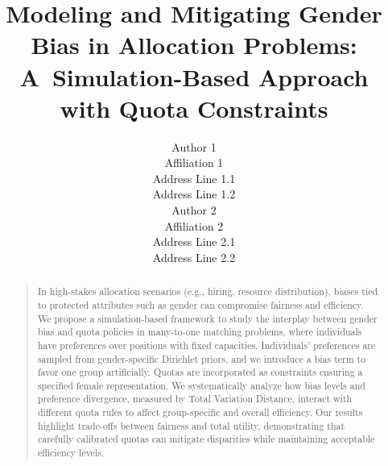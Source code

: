 \documentclass[letterpaper]{article}
\begin{document}
\title{Modeling and Mitigating Gender Bias in Allocation Problems: A~Simulation-Based Approach with Quota Constraints}
\author{Author 1\\
Affiliation 1\\
Address Line 1.1\\
Address Line 1.2\\
\And Author 2\\
Affiliation 2\\
Address Line 2.1\\
Address Line 2.2\\
}


\maketitle
\begin{abstract}
\begin{quote}
In high-stakes allocation scenarios (e.g., hiring, resource distribution), biases tied to protected attributes such as gender can compromise fairness and efficiency. We propose a simulation-based framework to study the interplay between gender bias and quota policies in many-to-one matching problems, where individuals have preferences over positions with fixed capacities. Individuals' preferences are sampled from gender-specific Dirichlet priors, and we introduce a bias term to favor one group artificially. Quotas are incorporated as constraints ensuring a specified female representation. We systematically analyze how bias levels and preference divergence, measured by Total Variation Distance, interact with different quota rules to affect group-specific and overall efficiency. Our results highlight trade-offs between fairness and total utility, demonstrating that carefully calibrated quotas can mitigate disparities while maintaining acceptable efficiency levels. 
\end{quote}
\end{abstract}
\end{document}
